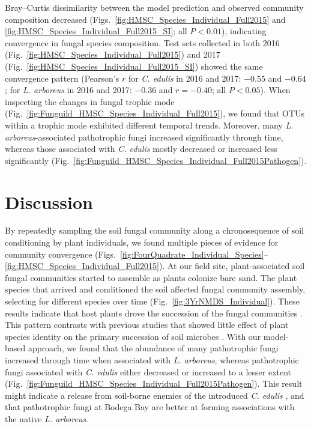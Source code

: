 Bray--Curtis dissimilarity between the model prediction and observed community composition decreased (Figs.~\ref{fig:HMSC_Species_Individual_Full2015} and \ref{fig:HMSC_Species_Individual_Full2015_SI}; all $P<0.01$), indicating convergence in fungal species composition.
Test sets collected in both 2016 (Fig.~\ref{fig:HMSC_Species_Individual_Full2015}) and 2017 (Fig.~\ref{fig:HMSC_Species_Individual_Full2015_SI}) showed the same convergence pattern (Pearson's $r$ for \textit{C. edulis} in 2016 and 2017: $-0.55$ and $-0.64$; for \textit{L. arboreus} in 2016 and 2017: $-0.36$ and $r=-0.40$; all $P < 0.05$). 
When inspecting the changes in fungal trophic mode (Fig.~\ref{fig:Funguild_HMSC_Species_Individual_Full2015}), we found that OTUs within a trophic mode exhibited different temporal trends. Moreover, many \textit{L. arboreus}-associated pathotrophic fungi increased significantly through time, whereas those associated with \textit{C. edulis} mostly decreased or increased less significantly (Fig.~\ref{fig:Funguild_HMSC_Species_Individual_Full2015Pathogen}).
\par



\section{Discussion}
By repeatedly sampling the soil fungal community along a chronosequence of soil conditioning by plant individuals, we found multiple pieces of evidence for community convergence (Figs.~\ref{fig:FourQuadrate_Individual_Species}--\ref{fig:HMSC_Species_Individual_Full2015}).
At our field site, plant-associated soil fungal communities started to assemble as plants colonize bare sand. 
The plant species that arrived and conditioned the soil affected fungal community assembly, selecting for different species over time (Fig.~\ref{fig:3YrNMDS_Individual}). These results indicate that host plants drove the succession of the fungal communities \citep{RoyBolduc2016, Scheublin2004}.
This pattern contrasts with previous studies that showed little effect of plant species identity on the primary succession of soil microbes \citep{BrownJumpponen2014, Sikes2014}.
With our model-based approach, we found that the abundance of many pathotrophic fungi increased through time when associated with \textit{L. arboreus}, whereas pathotrophic fungi associated with \textit{C. edulis} either decreased or increased to a lesser extent (Fig.~\ref{fig:Funguild_HMSC_Species_Individual_Full2015Pathogen}).
This result might indicate a release from soil-borne enemies of the introduced \textit{C. edulis} \citep{Keane2002, Callaway2004b}, and that pathotrophic fungi at Bodega Bay are better at forming associations with the native \textit{L. arboreus}.
\par


